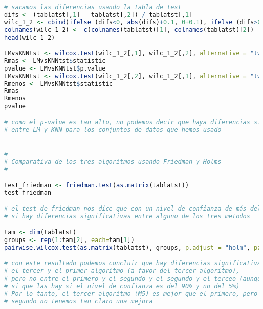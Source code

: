 \begin{lstlisting}[language=R]
# sacamos las diferencias usando la tabla de test
difs <- (tablatst[,1] - tablatst[,2]) / tablatst[,1]
wilc_1_2 <- cbind(ifelse (difs<0, abs(difs)+0.1, 0+0.1), ifelse (difs>0, abs(difs)+0.1, 0+0.1))
colnames(wilc_1_2) <- c(colnames(tablatst)[1], colnames(tablatst)[2])
head(wilc_1_2)

LMvsKNNtst <- wilcox.test(wilc_1_2[,1], wilc_1_2[,2], alternative = "two.sided", paired=TRUE)
Rmas <- LMvsKNNtst$statistic
pvalue <- LMvsKNNtst$p.value
LMvsKNNtst <- wilcox.test(wilc_1_2[,2], wilc_1_2[,1], alternative = "two.sided", paired=TRUE)
Rmenos <- LMvsKNNtst$statistic
Rmas
Rmenos
pvalue

# como el p-value es tan alto, no podemos decir que haya diferencias significativas
# entre LM y KNN para los conjuntos de datos que hemos usado


#
# Comparativa de los tres algoritmos usando Friedman y Holms
#

test_friedman <- friedman.test(as.matrix(tablatst))
test_friedman

# el test de friedman nos dice que con un nivel de confianza de más del 98%,
# si hay diferencias significativas entre alguno de los tres metodos

tam <- dim(tablatst)
groups <- rep(1:tam[2], each=tam[1])
pairwise.wilcox.test(as.matrix(tablatst), groups, p.adjust = "holm", paired = TRUE)

# con este resultado podemos concluir que hay diferencias significativas entre
# el tercer y el primer algoritmo (a favor del tercer algoritmo),
# pero no entre el primero y el segundo y el segundo y el terceo (aunque con este último
# si que las hay si el nivel de confianza es del 90% y no del 5%)
# Por lo tanto, el tercer algoritmo (M5) es mejor que el primero, pero con el
# segundo no tenemos tan claro una mejora

\end{lstlisting}


\newpage
